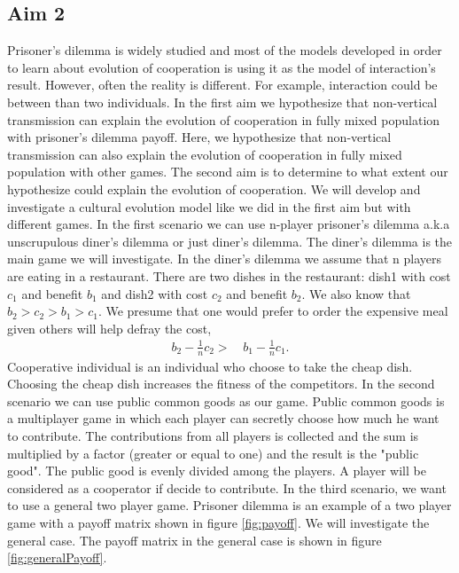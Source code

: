 \documentclass[12pt]{extarticle}
\begin{document}
\subsection*{Aim 2}
Prisoner's dilemma is widely studied and most of the models developed in order to learn about evolution of cooperation is using it as the model of interaction's result. However, often the reality is different. For example, interaction could be between than two individuals. 
In the first aim we hypothesize that non-vertical transmission can explain the evolution of cooperation in fully mixed population with prisoner's dilemma payoff. Here, we hypothesize that non-vertical transmission can also explain the evolution of cooperation in fully mixed population with other games. The second aim is to determine to what extent our hypothesize could explain the evolution of cooperation. We will develop and investigate a cultural evolution model like we did in the first aim but with different games. 
In the first scenario we can use n-player prisoner's dilemma a.k.a unscrupulous diner's dilemma or just diner's dilemma. The diner's dilemma is the main game we will investigate. In the diner's dilemma we assume that n players are eating in a restaurant. There are two dishes in the restaurant: dish1 with cost $c_1$ and benefit $b_1$ and dish2 with cost $c_2$ and benefit $b_2$. We also know that $b_2>c_2>b_1>c_1$. We presume that one would prefer to order the expensive meal given others will help defray the cost,
\begin{equation} 
\begin{split} \label{diner}
b_2-\frac{1}{n}c_2 >\, & b_1 - \frac{1}{n}c_1.
\end {split}
\end{equation}
Cooperative individual is an individual who choose to take the cheap dish. Choosing the cheap dish increases the fitness of the competitors. 
In the second scenario we can use public common goods as our game. Public common goods is a multiplayer game in which each player can secretly choose how much he want to contribute. The contributions from all players is collected and the sum is multiplied by a factor (greater or equal to one) and the result is the "public good". The public good is evenly divided among the players. A player will be considered as a cooperator if decide to contribute. 
In the third scenario, we want to use a general two player game. Prisoner dilemma is an example of a two player game with a payoff matrix shown in figure \ref{fig:payoff}. We will investigate the general case. The payoff matrix in the general case is shown in figure \ref{fig:generalPayoff}.
\end{document}
